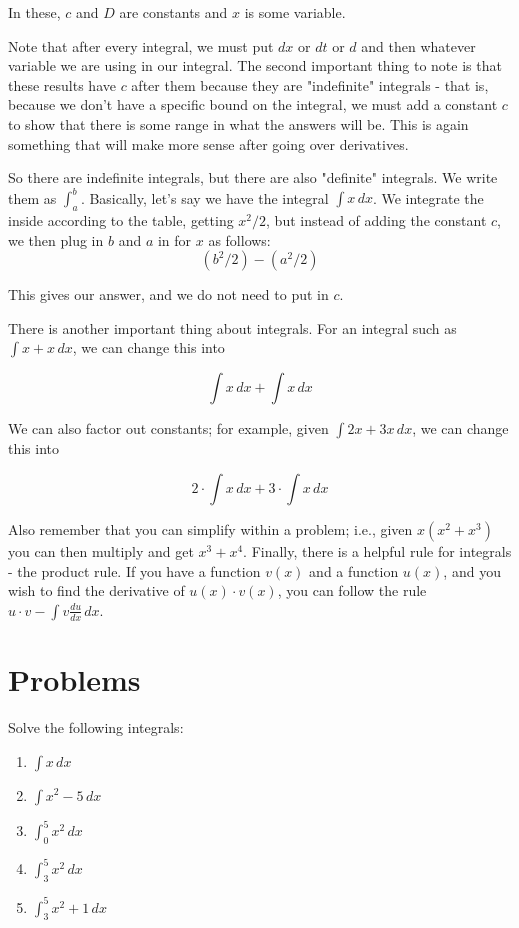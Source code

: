 \documentclass[12pt]{article}
\begin{document}
In these, $c$ and $D$ are constants and $x$ is some variable.

Note that after every integral, we must put $dx$ or $dt$ or $d$ and then whatever variable we are using in our integral. The second important thing to note is that these results have $c$ after them because they are "indefinite" integrals - that is, because we don't have a specific bound on the integral, we must add a constant $c$ to show that there is some range in what the answers will be. This is again something that will make more sense after going over derivatives.

So there are indefinite integrals, but there are also "definite" integrals. We write them as $\int^b_a$. Basically, let's say we have the integral $\int x \, dx$. We integrate the inside according to the table, getting $x^2/2$, but instead of adding the constant $c$, we then plug in $b$ and $a$ in for $x$ as follows: 
\begin{equation*}
    (b^2/2) - (a^2/2)
\end{equation*}

This gives our answer, and we do not need to put in $c$.

There is another important thing about integrals. For an integral such as $\int x+x \, dx$, we can change this into

\begin{equation*}
    \int x \, dx + \int x \, dx
\end{equation*}

We can also factor out constants; for example, given $\int 2x + 3x \, dx$, we can change this into 

\begin{equation*}
    2\cdot \int x \, dx + 3 \cdot \int x \, dx
\end{equation*}

Also remember that you can simplify within a problem; i.e., given $x(x^2 + x^3)$ you can then multiply and get $x^3 + x^4$. Finally, there is a helpful rule for integrals - the product rule. If you have a function $v(x)$ and a function $u(x)$, and you wish to find the derivative of $u(x)\cdot v(x)$, you can follow the rule $u\cdot v - \int v\frac{du}{dx}\, dx$. 

\section{Problems}
Solve the following integrals:

\begin{enumerate}
    \item $\int x \, dx$
    \item $\int x^2-5 \, dx$
    \item $\int^5_0 x^2 \, dx$
    \item $\int^5_3 x^2 \, dx$
    \item $\int^5_3 x^2 + 1 \, dx$
\end{enumerate}
\end{document}
